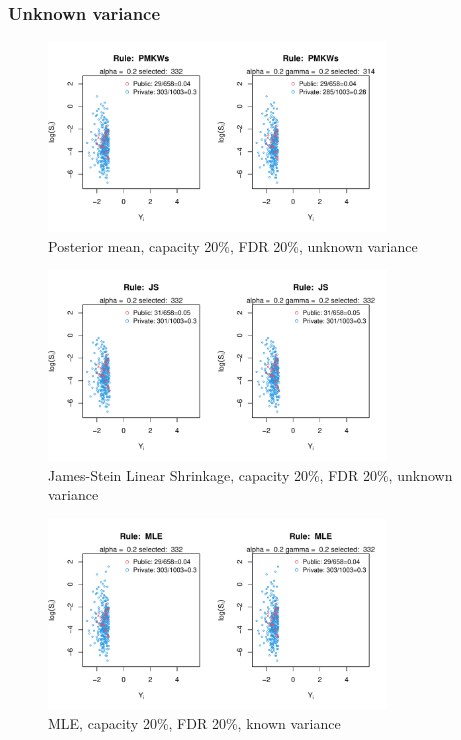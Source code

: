 \documentclass[12pt]{article}
\begin{document}
\newpage
\subsubsection{Unknown variance}
\label{section:unknown}

\begin{figure}[h!]
    \centering
    \includegraphics[width=0.8\textwidth]{../../Figures/2013-2022/GMM_m/GLVmix/Left_0.2_0.2_PMKWs.pdf}
    \caption{Posterior mean, capacity 20\%, FDR 20\%, unknown variance}
\end{figure}

\begin{figure}[h!]
    \centering
    \includegraphics[width=0.8\textwidth]{../../Figures/2013-2022/GMM_m/GLVmix/Left_0.2_0.2_JS.pdf}
    \caption{James-Stein Linear Shrinkage, capacity 20\%, FDR 20\%, unknown variance}
\end{figure}

\begin{figure}[h!]
    \centering
    \includegraphics[width=0.8\textwidth]{../../Figures/2013-2022/GMM_m/GLVmix/Left_0.2_0.2_MLE.pdf}
    \caption{MLE, capacity 20\%, FDR 20\%, known variance}
\end{figure}
\end{document}
